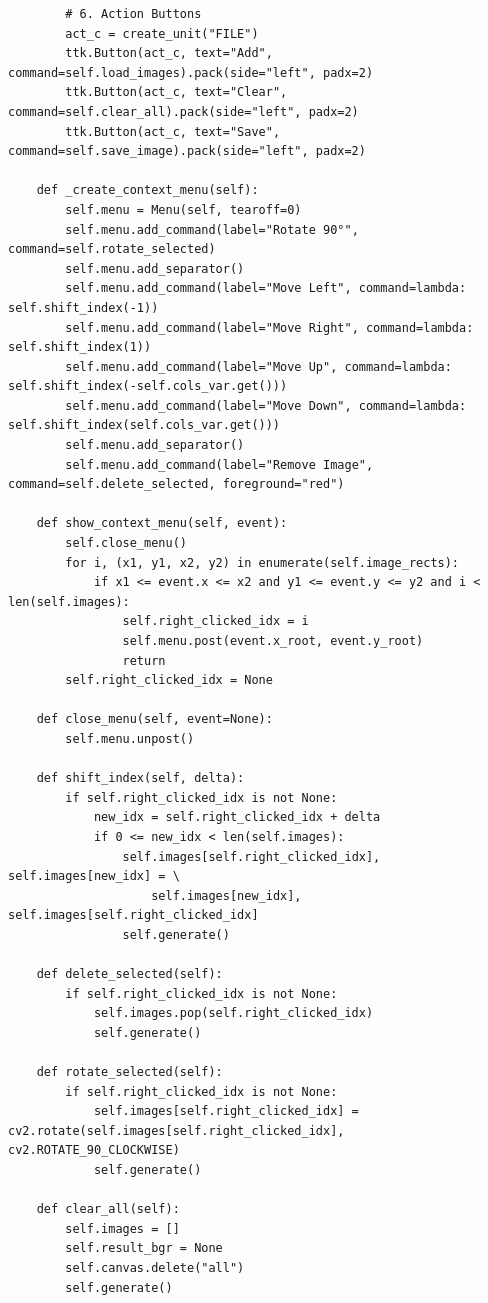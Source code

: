 \documentclass[a4paper]{article}
\begin{document}
\begin{verbatim}
        # 6. Action Buttons
        act_c = create_unit("FILE")
        ttk.Button(act_c, text="Add", command=self.load_images).pack(side="left", padx=2)
        ttk.Button(act_c, text="Clear", command=self.clear_all).pack(side="left", padx=2)
        ttk.Button(act_c, text="Save", command=self.save_image).pack(side="left", padx=2)

    def _create_context_menu(self):
        self.menu = Menu(self, tearoff=0)
        self.menu.add_command(label="Rotate 90°", command=self.rotate_selected)
        self.menu.add_separator()
        self.menu.add_command(label="Move Left", command=lambda: self.shift_index(-1))
        self.menu.add_command(label="Move Right", command=lambda: self.shift_index(1))
        self.menu.add_command(label="Move Up", command=lambda: self.shift_index(-self.cols_var.get()))
        self.menu.add_command(label="Move Down", command=lambda: self.shift_index(self.cols_var.get()))
        self.menu.add_separator()
        self.menu.add_command(label="Remove Image", command=self.delete_selected, foreground="red")

    def show_context_menu(self, event):
        self.close_menu()
        for i, (x1, y1, x2, y2) in enumerate(self.image_rects):
            if x1 <= event.x <= x2 and y1 <= event.y <= y2 and i < len(self.images):
                self.right_clicked_idx = i
                self.menu.post(event.x_root, event.y_root)
                return
        self.right_clicked_idx = None

    def close_menu(self, event=None):
        self.menu.unpost()

    def shift_index(self, delta):
        if self.right_clicked_idx is not None:
            new_idx = self.right_clicked_idx + delta
            if 0 <= new_idx < len(self.images):
                self.images[self.right_clicked_idx], self.images[new_idx] = \
                    self.images[new_idx], self.images[self.right_clicked_idx]
                self.generate()

    def delete_selected(self):
        if self.right_clicked_idx is not None:
            self.images.pop(self.right_clicked_idx)
            self.generate()

    def rotate_selected(self):
        if self.right_clicked_idx is not None:
            self.images[self.right_clicked_idx] = cv2.rotate(self.images[self.right_clicked_idx], cv2.ROTATE_90_CLOCKWISE)
            self.generate()

    def clear_all(self):
        self.images = []
        self.result_bgr = None
        self.canvas.delete("all")
        self.generate()


\end{verbatim}
\end{document}
